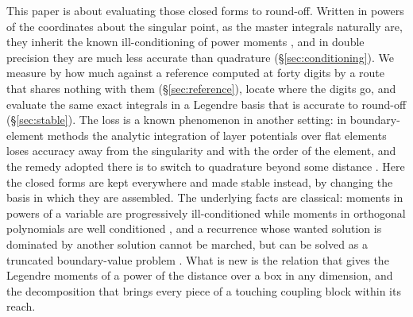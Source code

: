 \documentclass[11pt,a4paper]{article}
\begin{document}
This paper is about evaluating those closed forms to round-off. Written in powers of the coordinates
about the singular point, as the master integrals naturally are, they inherit the known ill-conditioning of
power moments \citep{Gautschi1970}, and in double precision they are much less accurate than quadrature
(\S\ref{sec:conditioning}). We measure by how much against a reference computed at forty digits by a route
that shares nothing with them (\S\ref{sec:reference}), locate where the digits go, and evaluate the same
exact integrals in a Legendre basis that is accurate to round-off (\S\ref{sec:stable}). The loss is a known
phenomenon in another setting: in boundary-element methods the analytic integration of layer potentials
over flat elements loses accuracy away from the singularity and with the order of the element, and the
remedy adopted there is to switch to quadrature beyond some distance
\citep{KanekoGumerovDuraiswami2024,GumerovKanekoDuraiswami2024}. Here the closed forms are kept
everywhere and made stable instead, by changing the basis in which they are assembled. The underlying
facts are classical: moments in powers of a variable are progressively ill-conditioned while moments in
orthogonal polynomials are well conditioned \citep{Gautschi1970}, and a recurrence whose wanted solution
is dominated by another solution cannot be marched, but can be solved as a truncated boundary-value
problem \citep{Gautschi1967,Olver1967}. What is new is the relation that gives the Legendre moments of a
power of the distance over a box in any dimension, and the decomposition that brings every piece of a
touching coupling block within its reach.
\end{document}
